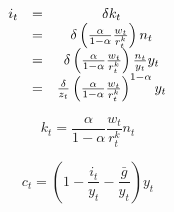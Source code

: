 \documentclass{article}
\begin{document}
\begin{equation}
\begin{array}{ccc}
i_{t} & = & \delta k_{t} \\ 
& = & \delta \left( \frac{\alpha }{1-\alpha }\frac{w_{t}}{r_{t}^{k}}\right)
n_{t} \\ 
& = & \delta \left( \frac{\alpha }{1-\alpha }\frac{w_{t}}{r_{t}^{k}}\right) 
\frac{n_{t}}{y_{t}}y_{t} \\ 
& = & \frac{\delta }{z_{t}}\left( \frac{\alpha }{1-\alpha }\frac{w_{t}}{%
r_{t}^{k}}\right) ^{1-\alpha }y_{t}%
\end{array}%
\end{equation}

\begin{equation}
k_{t}=\frac{\alpha }{1-\alpha }\frac{w_{t}}{r_{t}^{k}}n_{t}
\end{equation}

\begin{equation}
c_{t}=\left( 1-\frac{i_{t}}{y_{t}}-\frac{\bar{g}}{y_{t}}\right) y_{t}
\end{equation}
\end{document}
